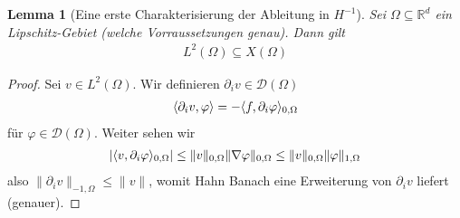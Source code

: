 \documentclass{scrartcl}
\newcounter{everything}
\newtheorem{lemma}[everything]{Lemma}
\def\R{\mathbb{R}}
\newcommand{\cD}{\mathcal{D}}
\newcommand{\norm}[1]{\lVert #1 \rVert}
\DeclarePairedDelimiter{\abs}{|}{|}
\DeclarePairedDelimiter{\inner}{\langle}{\rangle}
\begin{document}
\begin{lemma}[Eine erste Charakterisierung der Ableitung in $H^{-1}$]
	Sei $\Omega\subseteq\R^d$ ein Lipschitz-Gebiet (welche Vorraussetzungen genau). Dann gilt
	\begin{align*}
		L^2(\Omega)\subseteq X(\Omega)
	\end{align*}
\end{lemma}
\begin{proof}
	Sei $v\in L^2(\Omega)$. Wir definieren $\partial_i v\in \cD(\Omega)$
	\begin{align*}
		\inner{\partial_i v,\varphi} = -\inner{f,\partial_i\varphi}_{0,\Omega}
	\end{align*}
	für $\varphi\in\cD(\Omega)$. Weiter sehen wir
	\begin{align*}
		\abs{\inner{v,\partial_i\varphi}_{0,\Omega}}
		\leq \norm{v}_{0,\Omega}\norm{\nabla\varphi}_{0,\Omega}
		\leq \norm{v}_{0,\Omega}\norm{\varphi}_{1,\Omega}
	\end{align*}
	also $\norm{\partial_i v}_{-1,\Omega}\leq \norm{v}$, womit Hahn Banach eine Erweiterung von $\partial_iv$ liefert (genauer).
\end{proof}
\end{document}
